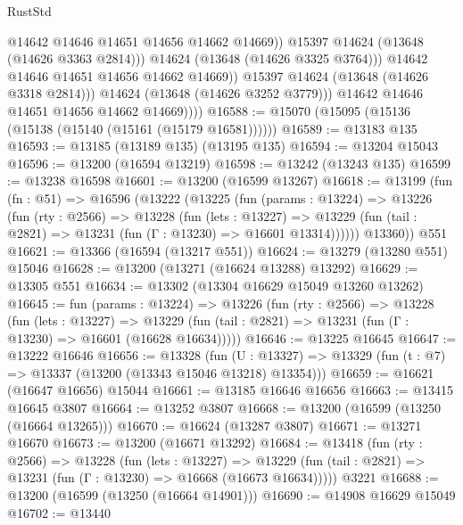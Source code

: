 \begin{lexlean}{RustStd}
\begin{coremodule}
                            @14642
                            @14646
                            @14651
                            @14656
                            @14662
                            @14669))
                        @15397
                        @14624
                        (@13648 (@14626 @3363 @2814)))
                      @14624
                      (@13648 (@14626 @3325 @3764)))
                    @14642
                    @14646
                    @14651
                    @14656
                    @14662
                    @14669))
                @15397
                @14624
                (@13648 (@14626 @3318 @2814)))
              @14624
              (@13648 (@14626 @3252 @3779)))
            @14642
            @14646
            @14651
            @14656
            @14662
            @14669))))
@16588 := @15070 (@15095 (@15136 (@15138 (@15140 (@15161 (@15179 @16581))))))
@16589 := @13183 @135
@16593 := @13185 (@13189 @135) (@13195 @135)
@16594 := @13204 @15043
@16596 := @13200 (@16594 @13219)
@16598 := @13242 (@13243 @135)
@16599 := @13238 @16598
@16601 := @13200 (@16599 @13267)
@16618 := @13199
    (fun (fn : @51) =>
    @16596
      (@13222
        (@13225
          (fun (params : @13224) =>
          @13226
            (fun (rty : @2566) =>
            @13228
              (fun (lets : @13227) =>
              @13229 (fun (tail : @2821) => @13231 (fun (Γ : @13230) => @16601 @13314))))))
        @13360))
    @551
@16621 := @13366 (@16594 (@13217 @551))
@16624 := @13279 (@13280 @551) @15046
@16628 := @13200 (@13271 (@16624 @13288) @13292)
@16629 := @13305 @551
@16634 := @13302 (@13304 @16629 @15049 @13260 @13262)
@16645 := fun (params : @13224) =>
  @13226
    (fun (rty : @2566) =>
    @13228
      (fun (lets : @13227) =>
      @13229 (fun (tail : @2821) => @13231 (fun (Γ : @13230) => @16601 (@16628 @16634)))))
@16646 := @13225 @16645
@16647 := @13222 @16646
@16656 := @13328
    (fun (U : @13327) => @13329 (fun (t : @7) => @13337 (@13200 (@13343 @15046 @13218) @13354)))
@16659 := @16621 (@16647 @16656) @15044
@16661 := @13185 @16646 @16656
@16663 := @13415 @16645 @3807
@16664 := @13252 @3807
@16668 := @13200 (@16599 (@13250 (@16664 @13265)))
@16670 := @16624 (@13287 @3807)
@16671 := @13271 @16670
@16673 := @13200 (@16671 @13292)
@16684 := @13418
    (fun (rty : @2566) =>
    @13228
      (fun (lets : @13227) =>
      @13229 (fun (tail : @2821) => @13231 (fun (Γ : @13230) => @16668 (@16673 @16634)))))
    @3221
@16688 := @13200 (@16599 (@13250 (@16664 @14901)))
@16690 := @14908 @16629 @15049
@16702 := @13440

\end{coremodule}
\end{lexlean}
